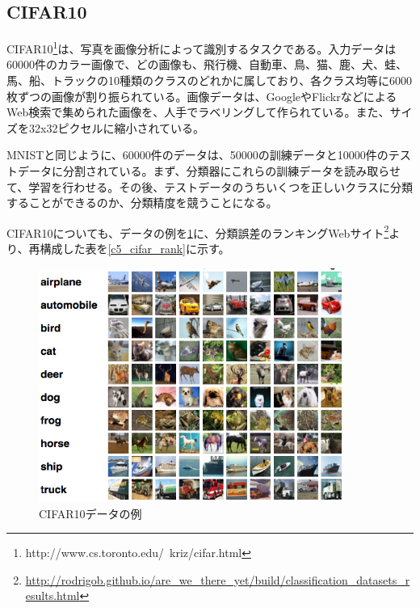 \subsection{CIFAR10}
CIFAR10\footnote{http://www.cs.toronto.edu/~kriz/cifar.html}は、写真を画像分析によって識別するタスクである\cite{Krizhevsky:2009:LMLFFTI:00}。入力データは60000件のカラー画像で、どの画像も、飛行機、自動車、鳥、猫、鹿、犬、蛙、馬、船、トラックの10種類のクラスのどれかに属しており、各クラス均等に6000枚ずつの画像が割り振られている。画像データは、GoogleやFlickrなどによるWeb検索で集められた画像を、人手でラベリングして作られている。また、サイズを32x32ピクセルに縮小されている。\par
MNISTと同じように、60000件のデータは、50000の訓練データと10000件のテストデータに分割されている。まず、分類器にこれらの訓練データを読み取らせて、学習を行わせる。その後、テストデータのうちいくつを正しいクラスに分類することができるのか、分類精度を競うことになる。\par
CIFAR10についても、データの例を\ref{c5_cifar_ex}に、分類誤差のランキングWebサイト\footnote{\url{http://rodrigob.github.io/are_we_there_yet/build/classification_datasets_results.html}}より、再構成した表を\ref{c5_cifar_rank}に示す。
\begin{figure}[tbp]
 \begin{center}
  \includegraphics[width=100mm]{img/c5/cifar_ex}
 \end{center}
 \caption{CIFAR10データの例}
 \label{c5_cifar_ex}
\end{figure}
